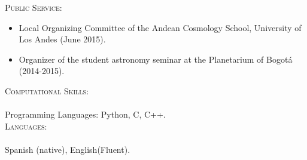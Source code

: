\documentclass[letterpaper]{article}
\begin{document}
\textsc{\Large Public Service:}\\
\begin{itemize}
\setlength\itemsep{0em}
\item Local Organizing Committee of the Andean Cosmology School,
University of Los Andes (June 2015).
\item Organizer of the student astronomy seminar at the Planetarium of Bogot\'a (2014-2015).
\end{itemize}


\textsc{\Large Computational Skills}:\\
\\
\indent Programming Languages: Python, C, C++.\\

\textsc{\Large Languages:}\\
\\
\indent Spanish (native), English(Fluent).
\end{document}

